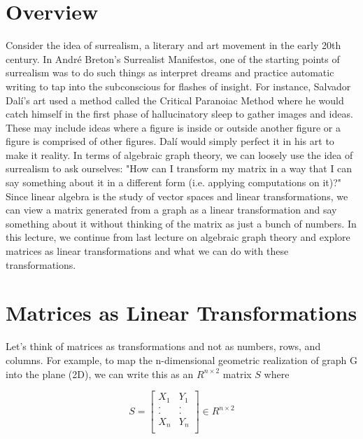 \documentclass{article}
\begin{document}

    \section{Overview}
    Consider the idea of surrealism, a literary and art movement in the early 20th century. In André Breton's Surrealist Manifestos, one of the starting points of surrealism was to do such things as interpret dreams and practice automatic writing to tap into the subconscious for flashes of insight. For instance, Salvador Dalí's art used a method called the Critical Paranoiac Method where he would catch himself in the first phase of hallucinatory sleep to gather images and ideas. These may include ideas where a figure is inside or outside another figure or a figure is comprised of other figures. Dalí would simply perfect it in his art to make it reality.
    \newline
    \newline
    In terms of algebraic graph theory, we can loosely use the idea of surrealism to ask ourselves: "How can I transform my matrix in a way that I can say something about it in a different form (i.e. applying computations on it)?" Since linear algebra is the study of vector spaces and linear transformations, we can view a matrix generated from a graph as a linear transformation and say something about it without thinking of the matrix as just a bunch of numbers.
    \newline
    \newline
    In this lecture, we continue from last lecture on algebraic graph theory and explore matrices as linear transformations and what we can do with these transformations.
    
    \section{Matrices as Linear Transformations}
    Let's think of matrices as transformations and not as numbers, rows, and columns. For example, to map the n-dimensional geometric realization of graph G into the plane (2D), we can write this as an $R^{n\times2}$ matrix $S$ where

    $$S =
        \left[ {\begin{array}{cccccccc}
            X_{1} & Y_{1} \\
            . & . \\
            . & . \\
            X_{n} & Y_{n} \\
        \end{array} } \right]
    \in R^{n\times2}$$
\end{document}

